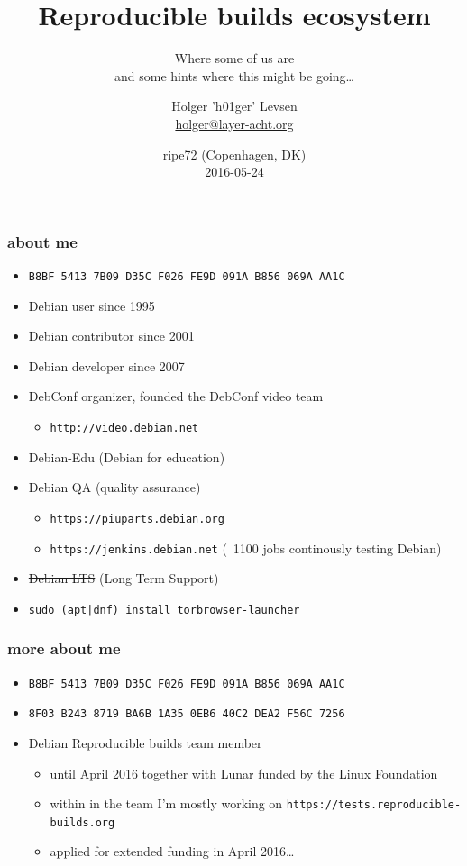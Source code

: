 \documentclass[14pt]{beamer}
\title[Reproducible builds ecosystem]{Reproducible builds ecosystem}
\subtitle{Where some of us are \\
and some hints where this might be going…}
\author[Holger 'h01ger' Levsen]{%
   \texorpdfstring{
            \centering
            Holger 'h01ger' Levsen\\
            \href{mailto:holger@layer-acht.org}{holger@layer-acht.org}
   }{h01ger}}
\institute[Debian]{}
\date[ripe72]{%
 ripe72 (Copenhagen, DK)\\
 \small{2016-05-24}}
\begin{document}
\begin{frame}[plain]
 \titlepage
\end{frame}

\begin{frame}
 \frametitle{about me}

 \begin{itemize}
  \item \small{\texttt{B8BF 5413 7B09 D35C F026  FE9D 091A B856 069A AA1C}}
  \item Debian user since 1995
  \item Debian contributor since 2001
  \item Debian developer since 2007
  \item DebConf organizer,
  founded the DebConf video team
   \begin{itemize}
    \item \texttt{http://video.debian.net}
   \end{itemize}
 \item Debian-Edu (Debian for education)
  \item Debian QA (quality assurance)
  \begin{itemize}
   \item \texttt{https://piuparts.debian.org}
   \item \texttt{https://jenkins.debian.net} (~1100 jobs continously testing Debian)
  \end{itemize}
  \item \sout{Debian LTS} (Long Term Support)
  \item \texttt{sudo (apt|dnf) install torbrowser-launcher}
 \end{itemize}
\end{frame}


\begin{frame}
 \frametitle{more about me}

 \begin{itemize}
  \item \small{\texttt{B8BF 5413 7B09 D35C F026  FE9D 091A B856 069A AA1C}}
  \item \small{\texttt{8F03 B243 8719 BA6B 1A35  0EB6 40C2 DEA2 F56C 7256}}
  \item Debian Reproducible builds team member
  \begin{itemize}
   \item until April 2016 together with Lunar funded by the Linux Foundation
   \item within in the team I'm mostly working on
   \texttt{https://tests.reproducible-builds.org}
   \item applied for extended funding in April 2016…
  \end{itemize}
\end{itemize}
\end{frame}
\end{document}
